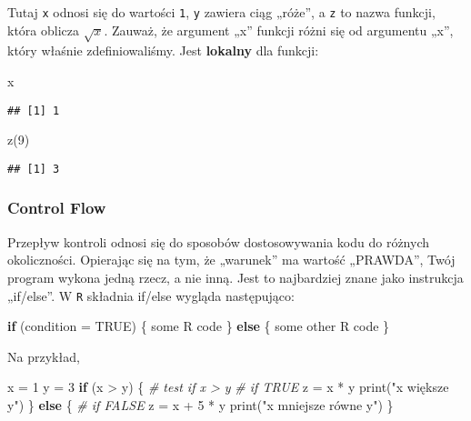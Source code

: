 \documentclass[
]{article}
\newenvironment{Shaded}{\begin{snugshade}}{\end{snugshade}}
\newcommand{\AttributeTok}[1]{\textcolor[rgb]{0.77,0.63,0.00}{#1}}
\newcommand{\CommentTok}[1]{\textcolor[rgb]{0.56,0.35,0.01}{\textit{#1}}}
\newcommand{\ConstantTok}[1]{\textcolor[rgb]{0.00,0.00,0.00}{#1}}
\newcommand{\ControlFlowTok}[1]{\textcolor[rgb]{0.13,0.29,0.53}{\textbf{#1}}}
\newcommand{\DecValTok}[1]{\textcolor[rgb]{0.00,0.00,0.81}{#1}}
\newcommand{\FunctionTok}[1]{\textcolor[rgb]{0.00,0.00,0.00}{#1}}
\newcommand{\NormalTok}[1]{#1}
\newcommand{\OtherTok}[1]{\textcolor[rgb]{0.56,0.35,0.01}{#1}}
\newcommand{\SpecialCharTok}[1]{\textcolor[rgb]{0.00,0.00,0.00}{#1}}
\newcommand{\StringTok}[1]{\textcolor[rgb]{0.31,0.60,0.02}{#1}}
\begin{document}
Tutaj \texttt{x} odnosi się do wartości \texttt{1}, \texttt{y} zawiera
ciąg „róże'', a \texttt{z} to nazwa funkcji, która oblicza \(\sqrt{x}\).
Zauważ, że argument „x'' funkcji różni się od argumentu „x'', który
właśnie zdefiniowaliśmy. Jest \textbf{lokalny} dla funkcji:

\begin{Shaded}
\begin{Highlighting}[]
\NormalTok{x}
\end{Highlighting}
\end{Shaded}

\begin{verbatim}
## [1] 1
\end{verbatim}

\begin{Shaded}
\begin{Highlighting}[]
\FunctionTok{z}\NormalTok{(}\DecValTok{9}\NormalTok{)}
\end{Highlighting}
\end{Shaded}

\begin{verbatim}
## [1] 3
\end{verbatim}

\hypertarget{control-flow}{%
\subsubsection{Control Flow}\label{control-flow}}

Przepływ kontroli odnosi się do sposobów dostosowywania kodu do różnych
okoliczności. Opierając się na tym, że „warunek'' ma wartość „PRAWDA'',
Twój program wykona jedną rzecz, a nie inną. Jest to najbardziej znane
jako instrukcja „if/else''. W \texttt{R} składnia if/else wygląda
następująco:

\begin{Shaded}
\begin{Highlighting}[]
\ControlFlowTok{if}\NormalTok{ (}\AttributeTok{condition =} \ConstantTok{TRUE}\NormalTok{) \{}
\NormalTok{  some R code}
\NormalTok{\} }\ControlFlowTok{else}\NormalTok{ \{}
\NormalTok{  some other R code}
\NormalTok{\}}
\end{Highlighting}
\end{Shaded}

Na przykład,

\begin{Shaded}
\begin{Highlighting}[]
\NormalTok{x }\OtherTok{=} \DecValTok{1}
\NormalTok{y }\OtherTok{=} \DecValTok{3}
\ControlFlowTok{if}\NormalTok{ (x }\SpecialCharTok{\textgreater{}}\NormalTok{ y) \{  }\CommentTok{\# test if x \textgreater{} y}
  \CommentTok{\# if TRUE}
\NormalTok{  z }\OtherTok{=}\NormalTok{ x }\SpecialCharTok{*}\NormalTok{ y}
  \FunctionTok{print}\NormalTok{(}\StringTok{"x większe y"}\NormalTok{)}
\NormalTok{\} }\ControlFlowTok{else}\NormalTok{ \{}
  \CommentTok{\# if FALSE}
\NormalTok{  z }\OtherTok{=}\NormalTok{ x }\SpecialCharTok{+} \DecValTok{5} \SpecialCharTok{*}\NormalTok{ y}
  \FunctionTok{print}\NormalTok{(}\StringTok{"x mniejsze równe y"}\NormalTok{)}
\NormalTok{\}}
\end{Highlighting}
\end{Shaded}
\end{document}
